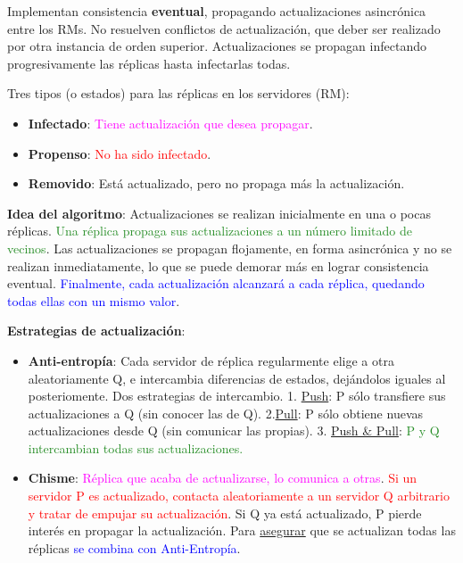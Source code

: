 \textcolor{Sepia}{Implementan consistencia \textbf{eventual}, propagando actualizaciones asincrónica entre los RMs}. No resuelven conflictos de actualización, que deber ser realizado por otra instancia de orden superior. \textcolor{Sepia}{Actualizaciones se propagan infectando progresivamente las réplicas hasta infectarlas todas. }

Tres tipos (o estados) para las réplicas en los servidores (RM):
\begin{itemize}
    \item \textbf{Infectado}: \textcolor{Fuchsia}{Tiene actualización que desea propagar}.
    \item \textbf{Propenso}: \textcolor{red}{No ha sido infectado}.
    \item \textbf{Removido}: \textcolor{Sepia}{Está actualizado, pero no propaga más la actualización}.    
\end{itemize}

\textbf{Idea del algoritmo}: Actualizaciones se realizan inicialmente en una o pocas réplicas. \textcolor{ForestGreen}{Una réplica propaga sus actualizaciones a un número limitado de vecinos}. \textcolor{Sepia}{Las actualizaciones se propagan flojamente, en forma asincrónica y no se realizan inmediatamente}, lo que se puede demorar más en lograr consistencia eventual. \textcolor{blue}{Finalmente, cada actualización alcanzará a cada réplica, quedando todas ellas con un mismo valor}.

\textbf{Estrategias de actualización}:
\begin{itemize}
    \item \textbf{Anti-entropía}: \textcolor{Sepia}{Cada servidor de réplica regularmente elige a otra aleatoriamente Q, e intercambia diferencias de estados}, dejándolos iguales al posteriomente. Dos estrategias de intercambio. 1. \underline{Push}: \textcolor{Sepia}{P sólo transfiere sus actualizaciones a Q} (sin conocer las de Q). 2.\underline{Pull}: \textcolor{Sepia}{P sólo obtiene nuevas actualizaciones desde Q} (sin comunicar las propias). 3. \underline{Push \& Pull}: \textcolor{ForestGreen}{P y Q intercambian todas sus actualizaciones.}
    \item \textbf{Chisme}: \textcolor{Fuchsia}{Réplica que acaba de actualizarse, lo comunica a otras}. \textcolor{Red}{Si un servidor P es actualizado, contacta aleatoriamente a un servidor Q arbitrario y tratar de empujar su actualización}. \textcolor{Sepia}{Si Q ya está actualizado, P pierde interés en propagar la actualización}. Para \underline{asegurar} que se actualizan todas las réplicas \textcolor{blue}{se combina con Anti-Entropía}.  
\end{itemize}

